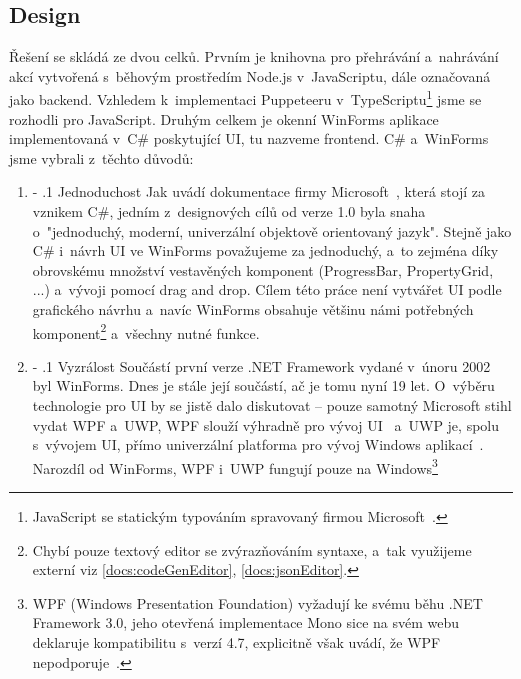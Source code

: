\documentclass[12pt, a4paper, twoside]{article}
\makeatletter
\renewcommand\paragraph{%
	\@startsection{subparagraph}{5}{0mm}%
	{-\baselineskip}%
	{.1\baselineskip}%
	{\normalfont\normalsize\bfseries}}
\makeatother
\begin{document}
	\subsection{Design}
	\label{sub_sec:design}
	Řešení se skládá ze dvou celků. Prvním je knihovna pro přehrávání a~nahrávání akcí vytvořená s~běhovým prostředím Node.js v~JavaScriptu, dále označovaná jako backend. Vzhledem k~implementaci Puppeteeru v~TypeScriptu\footnote{JavaScript se statickým typováním spravovaný firmou Microsoft~\cite{typeScript}.} jsme se rozhodli pro JavaScript. 
	\newpage
	Druhým celkem je okenní WinForms aplikace implementovaná v~C\# poskytující UI, tu nazveme frontend. C\# a~WinForms jsme vybrali z~těchto důvodů:
	\begin{enumerate}[leftmargin=*]
		\item \paragraph{Jednoduchost}
		Jak uvádí dokumentace firmy Microsoft~\cite{csharpHistory}, která stojí za vznikem C\#, jedním z~designových cílů od verze 1.0 byla snaha o~"jednoduchý, moderní, univerzální objektově orientovaný jazyk". Stejně jako C\# i~návrh UI ve WinForms považujeme za jednoduchý, a~to zejména díky obrovskému množství vestavěných komponent (ProgressBar, PropertyGrid, ...) a~vývoji pomocí drag and drop. Cílem této práce není vytvářet UI podle grafického návrhu a~navíc WinForms obsahuje většinu námi potřebných komponent\footnote{Chybí pouze textový editor se zvýrazňováním syntaxe, a~tak využijeme externí viz \ref{docs:codeGenEditor}, \ref{docs:jsonEditor}.} a~všechny nutné funkce.
		\item \paragraph{Vyzrálost}
		Součástí první verze .NET Framework vydané v~únoru 2002 byl WinForms. Dnes je stále její součástí, ač je tomu nyní 19 let. O~výběru technologie pro UI by se jistě dalo diskutovat -- pouze samotný Microsoft stihl vydat WPF a~UWP, WPF slouží výhradně pro vývoj UI~\cite{wpfDocs} a~UWP je, spolu s~vývojem UI, přímo univerzální platforma pro vývoj Windows aplikací~\cite{uwpDocs}. Narozdíl od WinForms, WPF i~UWP fungují pouze na Windows\footnote{WPF (Windows Presentation Foundation) vyžadují ke svému běhu .NET Framework 3.0, jeho otevřená implementace Mono \cite{monoProject} sice na svém webu deklaruje kompatibilitu s~verzí 4.7, explicitně však uvádí, že WPF nepodporuje~\cite{monoCompatibility}.
			
}
\end{enumerate}
\end{document}
